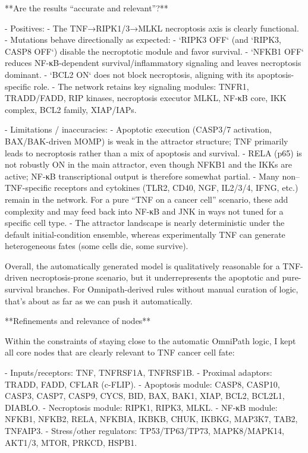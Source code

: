 \documentclass[11pt,a4paper]{article}
\begin{document}
\begin{copilotbox}
**Are the results “accurate and relevant”?**

- Positives:
  - The TNF→RIPK1/3→MLKL necroptosis axis is clearly functional.
  - Mutations behave directionally as expected:
    - `RIPK3 OFF` (and `RIPK3, CASP8 OFF`) disable the necroptotic module and favor survival.
    - `NFKB1 OFF` reduces NF-κB-dependent survival/inflammatory signaling and leaves necroptosis dominant.
    - `BCL2 ON` does not block necroptosis, aligning with its apoptosis-specific role.
  - The network retains key signaling modules: TNFR1, TRADD/FADD, RIP kinases, necroptosis executor MLKL, NF-κB core, IKK complex, BCL2 family, XIAP/IAPs.

- Limitations / inaccuracies:
  - Apoptotic execution (CASP3/7 activation, BAX/BAK-driven MOMP) is weak in the attractor structure; TNF primarily leads to necroptosis rather than a mix of apoptosis and survival.
  - RELA (p65) is not robustly ON in the main attractor, even though NFKB1 and the IKKs are active; NF-κB transcriptional output is therefore somewhat partial.
  - Many non–TNF-specific receptors and cytokines (TLR2, CD40, NGF, IL2/3/4, IFNG, etc.) remain in the network. For a pure “TNF on a cancer cell” scenario, these add complexity and may feed back into NF-κB and JNK in ways not tuned for a specific cell type.
  - The attractor landscape is nearly deterministic under the default initial-condition ensemble, whereas experimentally TNF can generate heterogeneous fates (some cells die, some survive).

Overall, the automatically generated model is qualitatively reasonable for a TNF-driven necroptosis-prone scenario, but it underrepresents the apoptotic and pure-survival branches. For Omnipath-derived rules without manual curation of logic, that’s about as far as we can push it automatically.

**Refinements and relevance of nodes**

Within the constraints of staying close to the automatic OmniPath logic, I kept all core nodes that are clearly relevant to TNF cancer cell fate:

- Inputs/receptors: TNF, TNFRSF1A, TNFRSF1B.
- Proximal adaptors: TRADD, FADD, CFLAR (c-FLIP).
- Apoptosis module: CASP8, CASP10, CASP3, CASP7, CASP9, CYCS, BID, BAX, BAK1, XIAP, BCL2, BCL2L1, DIABLO.
- Necroptosis module: RIPK1, RIPK3, MLKL.
- NF-κB module: NFKB1, NFKB2, RELA, NFKBIA, IKBKB, CHUK, IKBKG, MAP3K7, TAB2, TNFAIP3.
- Stress/other regulators: TP53/TP63/TP73, MAPK8/MAPK14, AKT1/3, MTOR, PRKCD, HSPB1.


\end{copilotbox}
\end{document}
